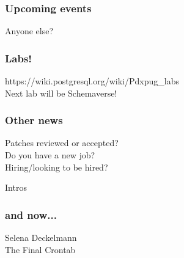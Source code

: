 \documentclass{beamer}
\begin{document}
\frame
{
  \frametitle{Upcoming events}
  \begin{center}
Anyone else?
  \end{center}
}

\frame
{
  \frametitle{Labs!}
  \begin{center}
https://wiki.postgresql.org/wiki/Pdxpug\_labs\\
Next lab will be Schemaverse!
  \end{center}
}

\frame
{
  \frametitle{Other news}
  \begin{center}
Patches reviewed or accepted?\\
Do you have a new job?\\
Hiring/looking to be hired?
  \end{center}
}

\frame
{
  \begin{center}
  {\huge Intros}
  \end{center}
}

\frame
{
  \frametitle{and now...}
  \begin{center}
{\huge Selena Deckelmann}\\
The Final Crontab
  \end{center}
}
\end{document}
